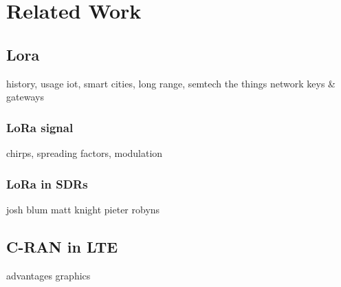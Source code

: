 \chapter{Related Work}

\section{Lora}
history, usage iot, smart cities, long range, semtech
the things network keys \& gateways
\subsection{LoRa signal}
chirps, spreading factors, modulation
\subsection{LoRa in SDRs}
josh blum
matt knight
pieter robyns

\section{C-RAN in LTE}
advantages
graphics